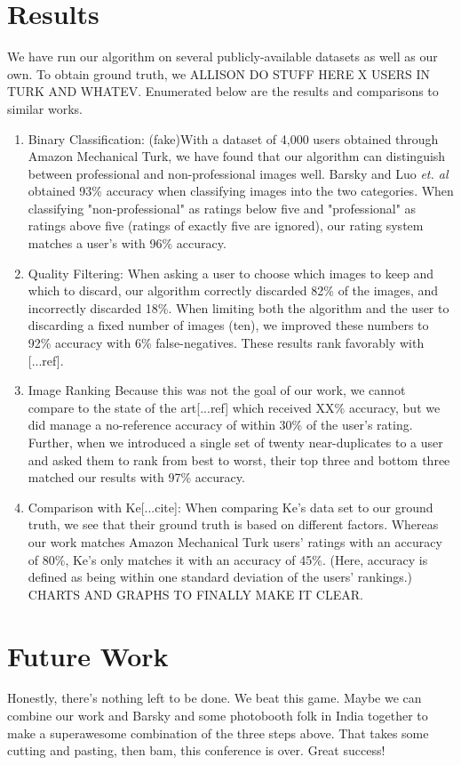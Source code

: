 \documentclass[twocolumn]{article}
\begin{document}
\section{Results}
We have run our algorithm on several publicly-available datasets as well as our own. To obtain ground truth, we ALLISON DO STUFF HERE X USERS IN TURK AND WHATEV.
Enumerated below are the results and comparisons to similar works.
\begin{enumerate}
\item Binary Classification: (fake)With a dataset of 4,000 users obtained through Amazon Mechanical Turk, we have found that our algorithm can distinguish between professional and non-professional images well. Barsky \cite{Yeh:2010:PPR:1873951.1873963} and Luo \emph{et. al}\cite{springerlink:10.1007/978-3-540-88690-7_29} obtained 93\% accuracy when classifying images into the two categories. When classifying "non-professional" as ratings below five and "professional" as ratings above five (ratings of exactly five are ignored), our rating system matches a user's with 96\% accuracy.
\item Quality Filtering: When asking a user to choose which images to keep and which to discard, our algorithm correctly discarded 82\% of the images, and incorrectly discarded 18\%. When limiting both the algorithm and the user to discarding a fixed number of images (ten), we improved these numbers to 92\% accuracy with 6\% false-negatives. These results rank favorably with [...ref].
\item Image Ranking Because this was not the goal of our work, we cannot compare to the state of the art[...ref] which received XX\% accuracy, but we did manage a no-reference accuracy of within 30\% of the user's rating. Further, when we introduced a single set of twenty near-duplicates to a user and asked them to rank from best to worst, their top three and bottom three matched our results with 97\% accuracy.
\item Comparison with Ke[...cite]: When comparing Ke's data set to our ground truth, we see that their ground truth is based on different factors. Whereas our work matches Amazon Mechanical Turk users' ratings with an accuracy of 80\%, Ke's only matches it with an accuracy of 45\%. (Here, accuracy is defined as being within one standard deviation of the users' rankings.) CHARTS AND GRAPHS TO FINALLY MAKE IT CLEAR.
\end{enumerate}
\section{Future Work}
Honestly, there's nothing left to be done. We beat this game. Maybe we can combine our work and Barsky and some photobooth folk in India together to make a superawesome combination of the three steps above. That takes some cutting and pasting, then bam, this conference is over. Great success!


\end{document}
